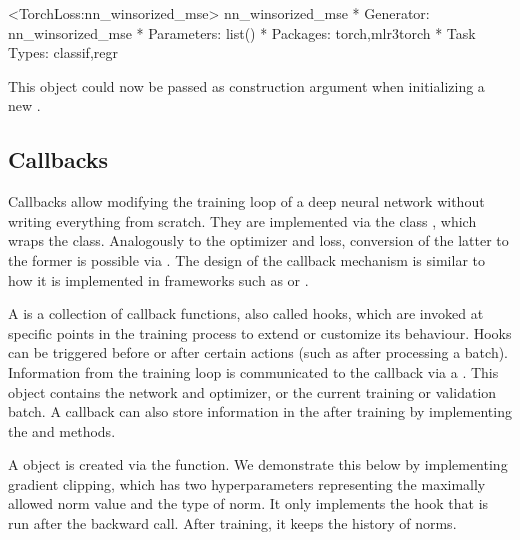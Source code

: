 \documentclass[article]{jss}
\theoremstyle{definition}
\begin{document}
\begin{CodeOutput}
<TorchLoss:nn_winsorized_mse> nn_winsorized_mse
* Generator: nn_winsorized_mse
* Parameters: list()
* Packages: torch,mlr3torch
* Task Types: classif,regr
\end{CodeOutput}

This object could now be passed as construction argument  when initializing a new .

\subsection{Callbacks}\label{sec:extending-callbacks}

Callbacks allow modifying the training loop of a deep neural network without writing everything from scratch.
They are implemented via the  class , which wraps the  class.
Analogously to the optimizer and loss, conversion of the latter to the former is possible via .
The design of the callback mechanism is similar to how it is implemented in frameworks such as \keras{} or \luz{} \citep{ref-chollet2018keras, ref-luz2023}.

A  is a collection of callback functions, also called hooks, which are invoked at specific points in the training process to extend or customize its behaviour.
Hooks can be triggered before or after certain actions (such as after processing a batch).
Information from the training loop is communicated to the callback via a .
This object contains the network and optimizer, or the current training or validation batch.
A callback can also store information in the  after training by implementing the  and  methods.

A  object is created via the  function.
We demonstrate this below by implementing gradient clipping, which has two hyperparameters representing the maximally allowed norm value and the type of norm.
It only implements the hook that is run after the backward call.
After training, it keeps the history of norms.
\end{document}
